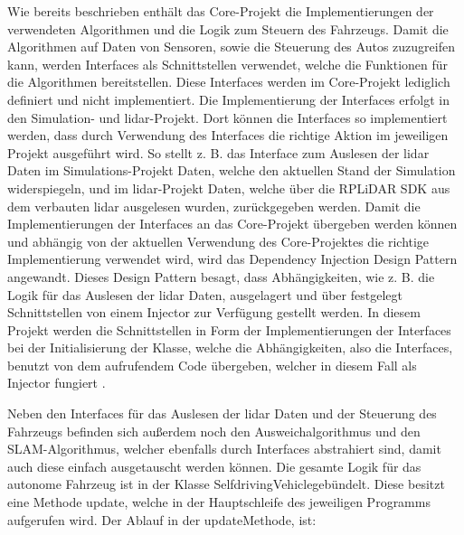 Wie bereits beschrieben enthält das Core-Projekt die Implementierungen der verwendeten Algorithmen und die Logik zum Steuern des Fahrzeugs. Damit die Algorithmen auf Daten von Sensoren, sowie die Steuerung des Autos zuzugreifen kann, werden Interfaces als Schnittstellen verwendet, welche die Funktionen für die Algorithmen bereitstellen. Diese Interfaces werden im Core-Projekt lediglich definiert und nicht implementiert. Die Implementierung der Interfaces erfolgt in den Simulation- und \ac{lidar}-Projekt. Dort können die Interfaces so implementiert werden, dass durch Verwendung des Interfaces die richtige Aktion im jeweiligen Projekt ausgeführt wird. So stellt z. B. das Interface zum Auslesen der \ac{lidar} Daten im Simulations-Projekt Daten, welche den aktuellen Stand der Simulation widerspiegeln, und im \ac{lidar}-Projekt Daten, welche über die RPLiDAR SDK aus dem verbauten \ac{lidar} ausgelesen wurden, zurückgegeben werden. Damit die Implementierungen der Interfaces an das Core-Projekt übergeben werden können und abhängig von der aktuellen Verwendung des Core-Projektes die richtige Implementierung verwendet wird, wird das Dependency Injection Design Pattern angewandt. Dieses Design Pattern besagt, dass Abhängigkeiten, wie z. B. die Logik für das Auslesen der \ac{lidar} Daten, ausgelagert und über festgelegt Schnittstellen von einem Injector zur Verfügung gestellt werden. In diesem Projekt werden die Schnittstellen in Form der Implementierungen der Interfaces bei der Initialisierung der Klasse, welche die Abhängigkeiten, also die Interfaces, benutzt von dem aufrufendem Code übergeben, welcher in diesem Fall als Injector fungiert \cite{dependencyInjection}. 

Neben den Interfaces für das Auslesen der \ac{lidar} Daten und der Steuerung des Fahrzeugs befinden sich außerdem noch den Ausweichalgorithmus und den SLAM-Algorithmus, welcher ebenfalls durch Interfaces abstrahiert sind, damit auch diese einfach ausgetauscht werden können. Die gesamte Logik für das autonome Fahrzeug ist in der Klasse \dq SelfdrivingVehicle\dq\space gebündelt. Diese besitzt eine Methode \dq update\dq, welche in der Hauptschleife des jeweiligen Programms aufgerufen wird. Der Ablauf in der \dq update\dq\space Methode, ist:

